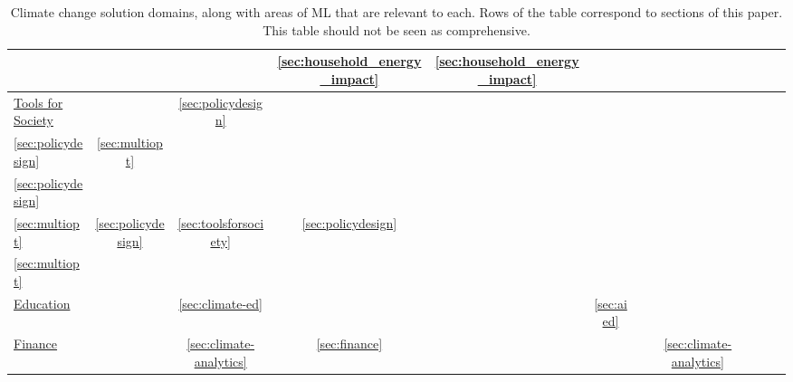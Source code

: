\begin{table*}[t]
\begin{tabular}{l|cccccccccc}
         & %
         & %
         & \ref{sec:household_energy_impact} %
         & \ref{sec:household_energy_impact} %
    \\ \hline
         \hyperref[sec:toolsforsociety]{\small{Tools for Society}}
         & %
         & \ref{sec:policydesign}  %
         &
         \specialcell{\ref{sec:marketsandpricing}\\\ref{sec:policydesign}}%
         & \ref{sec:multiopt} %
         & \specialcell{\ref{sec:marketsandpricing}\\ \ref{sec:policydesign}} %
         & \specialcell{\ref{sec:policydesign}\\ \ref{sec:multiopt}} %
         & \ref{sec:policydesign} %
         &\ref{sec:toolsforsociety} %
         & \ref{sec:policydesign} %
         & \specialcell{\ref{sec:policydesign}\\ \ref{sec:multiopt}}%
    \\ \hline
         \hyperref[sec:education]{\small{Education}}
         & %
         & \ref{sec:climate-ed} %
         & %
         & %
         & \ref{sec:aied}%
         & %
         & %
         & %
         & %
         & %
    \\ \hline
         \hyperref[sec:finance]{\small{Finance}}
         & %
         & \ref{sec:climate-analytics}%
         & \ref{sec:finance}
         & %
         & %
         & %
         & \ref{sec:climate-analytics}%
         & %
         & %
         & %
    \\ \bottomrule
    \end{tabular}
    \endgroup
    \caption{Climate change solution domains, along with areas of ML that are relevant to each. Rows of the table correspond to sections of this paper. This table should not be seen as comprehensive.}
    \label{tab:summary}
\end{table*}
